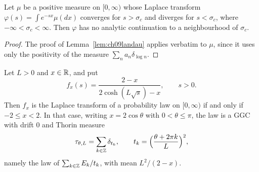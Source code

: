 \begin{lemma}\label{lem:10clandau}
Let $\mu$ be a positive measure on $[0,\infty)$ whose Laplace transform $\varphi(s)=\int e^{-sx}\mu(dx)$ converges for $s>\sigma_c$ and diverges for $s<\sigma_c$, where $-\infty<\sigma_c<\infty$. Then $\varphi$ has no analytic continuation to a neighbourhood of $\sigma_c$.
\end{lemma}

\begin{proof}
The proof of Lemma~\ref{lem:ch09landau} applies verbatim to $\mu$, since it uses only the positivity of the measure $\sum_na_n\delta_{\log n}$.
\end{proof}

\begin{theorem}\label{thm:10clocal}
Let $L>0$ and $x\in\mathbb{R}$, and put
\[
f_x(s)=\frac{2-x}{2\cosh(L\sqrt s)-x},\qquad s>0 .
\]
Then $f_x$ is the Laplace transform of a probability law on $[0,\infty)$ if and only if $-2\le x<2$. In that case, writing $x=2\cos\theta$ with $0<\theta\le\pi$, the law is a GGC with drift $0$ and Thorin measure
\[
\tau_{\theta,L}=\sum_{k\in\mathbb{Z}}\delta_{t_k},\qquad t_k=\Bigl(\frac{\theta+2\pi k}{L}\Bigr)^2,
\]
namely the law of $\sum_{k\in\mathbb{Z}}E_k/t_k$, with mean $L^2/(2-x)$.
\end{theorem}

